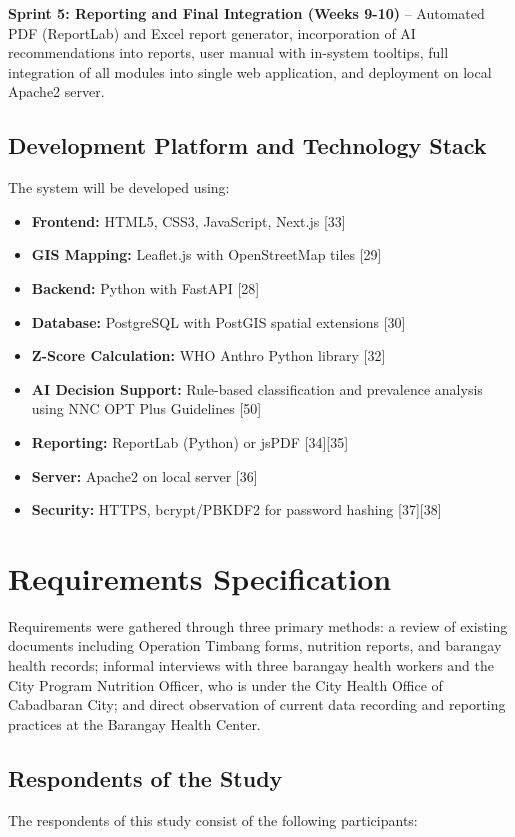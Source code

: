 \documentclass[12pt, a4paper]{report}
\begin{document}
\textbf{Sprint 5: Reporting and Final Integration (Weeks 9-10)} -- Automated PDF (ReportLab) and Excel report generator, incorporation of AI recommendations into reports, user manual with in-system tooltips, full integration of all modules into single web application, and deployment on local Apache2 server.

\subsection{Development Platform and Technology Stack}
\label{subsec:dev_stack}
The system will be developed using:
\begin{itemize}
    \item \textbf{Frontend:} HTML5, CSS3, JavaScript, Next.js [33]
    \item \textbf{GIS Mapping:} Leaflet.js with OpenStreetMap tiles [29]
    \item \textbf{Backend:} Python with FastAPI [28]
    \item \textbf{Database:} PostgreSQL with PostGIS spatial extensions [30]
    \item \textbf{Z-Score Calculation:} WHO Anthro Python library [32]
    \item \textbf{AI Decision Support:} Rule-based classification and prevalence analysis using NNC OPT Plus Guidelines [50]
    \item \textbf{Reporting:} ReportLab (Python) or jsPDF [34][35]
    \item \textbf{Server:} Apache2 on local server [36]
    \item \textbf{Security:} HTTPS, bcrypt/PBKDF2 for password hashing [37][38]
\end{itemize}

\section{Requirements Specification}
\label{sec:requirements}
Requirements were gathered through three primary methods: a review of existing documents including Operation Timbang forms, nutrition reports, and barangay health records; informal interviews with three barangay health workers and the City Program Nutrition Officer, who is under the City Health Office of Cabadbaran City; and direct observation of current data recording and reporting practices at the Barangay Health Center.

\subsection{Respondents of the Study}
\label{subsec:respondents}
The respondents of this study consist of the following participants:
\end{document}
